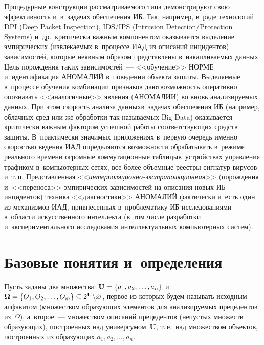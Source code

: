 \begin{multicols}{2}
    Процедурные конструкции рассматриваемого типа демонстрируют свою 
эффективность и~в~задачах обеспечения 
ИБ. Так, например, в~ряде технологий DPI (Deep Packet Inspection), IDS/IPS\linebreak 
(Intrusion Detection/Protection Systems) и~др.\ критически важным 
компонентом оказывается выделение эмпирических (извлекаемых в~процессе 
ИАД из описаний инцидентов) зависимостей, которые неявным образом 
представлены в~накапливаемых данных. Цель порождения таких 
зависимостей~--- <<обучение>> НОРМЕ и~идентификация АНОМАЛИЙ 
в~поведении объекта зашиты. Выделяемые в~процессе обучения комбинации 
признаков дают\linebreak возможность оперативно опознавать <<аналогичные>> 
явления (АНОМАЛИИ) во вновь анализиру\-емых данных. При этом скорость 
анализа данных\linebreak в~задачах обеспечения ИБ (например, облачных сред или же 
обработки так называемых Big Data) оказывается критически важным 
фактором успешной работы соответствующих средств защиты. 
В~практически значимых приложениях в~первую очередь именно скоростью 
ведения ИАД определяются возможности обрабатывать в~режиме реального 
времени огромные коммутационные таблицы\linebreak в~устройствах управления 
трафиком в~ком\-пью\-тер\-ных сетях, все более объемные реестры %
сигнатур вирусов и~т.\,п. Представленная  
<<\textit{ин\-тер\-по\-ля\-ци\-он\-но-экс\-тра\-по\-ля\-ци\-он\-ная}>> 
(порождения и~<<переноса>> эмпирических зависимостей на описания 
новых ИБ-ин\-ци\-ден\-тов) техника <<диагностики>> АНОМАЛИЙ 
фактически и~есть один из механизмов ИАД, привнесенных в~проблематику 
ИБ исследованиями в~об\-ласти искусственного интеллекта (в~том числе 
разработки и~экспериментального исследования интеллектуальных 
компьютерных систем).
{

}

\vspace*{-8pt}
    
\section{Базовые понятия и~определения}

\vspace*{-3pt}
    
    Пусть заданы два множества: $\mathbf{U} \hm= \{a_1, a_2, \ldots, 
a_n\}$ и~$\boldsymbol{\Omega}\hm= \{O_1, O_2, \ldots, O_m\}\subseteq 2^{\mathbf{U}}\backslash 
\varnothing$, 
 первое из которых будем называть исходным алфавитом 
(множеством образующих элементов для анализируемых прецедентов 
из~$\Omega$), а~второе~--- множеством описаний прецедентов (непустых 
множеств образующих), построенных над универсумом~$\mathbf{U}$, т.\,е.\ 
над множеством объектов, построенных из образующих $a_1, a_2, \ldots, 
a_n$.
    

\end{multicols}
